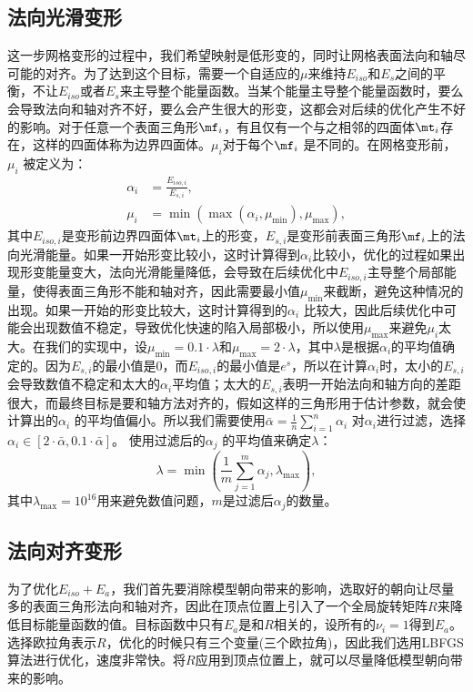 \subsection{法向光滑变形} \label{subsec:smooth}
这一步网格变形的过程中，我们希望映射是低形变的，同时让网格表面法向和轴尽可能的对齐。为了达到这个目标，需要一个自适应的$\mu$来维持$E_{iso}$和$E_s$之间的平衡，不让$E_{iso}$或者$E_s$来主导整个能量函数。当某个能量主导整个能量函数时，要么会导致法向和轴对齐不好，要么会产生很大的形变，这都会对后续的优化产生不好的影响。对于任意一个表面三角形$\mf_i$，有且仅有一个与之相邻的四面体$\mt_i$存在，这样的四面体称为边界四面体。$\mu_i$对于每个$\mf_i$ 是不同的。在网格变形前，$\mu_i$ 被定义为：
\begin{align}
\alpha_i &= \frac{E_{iso, i}}{E_{s, i}}, \\
\mu_i &= \min \left( \max \left( \alpha_i, \mu_{\min} \right) , \mu_{\max} \right),
\end{align}
其中$E_{iso, i}$是变形前边界四面体$\mt_i$上的形变，$E_{s, i}$是变形前表面三角形$\mf_i$上的法向光滑能量。如果一开始形变比较小，这时计算得到$\alpha_i$比较小，优化的过程如果出现形变能量变大，法向光滑能量降低，会导致在后续优化中$E_{iso,i}$主导整个局部能量，使得表面三角形不能和轴对齐，因此需要最小值$\mu_{\min}$来截断，避免这种情况的出现。如果一开始的形变比较大，这时计算得到的$\alpha_i$ 比较大，因此后续优化中可能会出现数值不稳定，导致优化快速的陷入局部极小，所以使用$\mu_{\max}$来避免$\mu_i$太大。在我们的实现中，设$\mu_{\min} = 0.1 \cdot \lambda$和$\mu_{\max} = 2 \cdot \lambda$，其中$\lambda$是根据$\alpha_i$的平均值确定的。因为$E_{s, i}$的最小值是0，而$E_{iso, i}$的最小值是$e^s$，所以在计算$\alpha_i$时，太小的$E_{s, i}$会导致数值不稳定和太大的$\alpha_i$平均值；太大的$E_{s, i}$表明一开始法向和轴方向的差距很大，而最终目标是要和轴方法对齐的，假如这样的三角形用于估计参数，就会使计算出的$\alpha_i$ 的平均值偏小。所以我们需要使用$ \bar{\alpha} = \frac{1}{n} \sum_{i=1}^n \alpha_i$ 对$\alpha_i$进行过滤，选择$\alpha_i \in \left[ 2 \cdot \bar{\alpha}, 0.1 \cdot \bar{\alpha} \right]$。 使用过滤后的$\alpha_j$ 的平均值来确定$\lambda$：
\begin{equation}
\lambda = \min \left( \frac{1}{m} \sum_{j=1}^m \alpha_j , \lambda_{\max} \right),
\end{equation}
其中$\lambda_{\max} = 10^{16}$用来避免数值问题，$m$是过滤后$\alpha_j$的数量。

\subsection{法向对齐变形} \label{subsec:align}
为了优化$E_{iso} + E_a$，我们首先要消除模型朝向带来的影响，选取好的朝向让尽量多的表面三角形法向和轴对齐，因此在顶点位置上引入了一个全局旋转矩阵$R$来降低目标能量函数的值。目标函数中只有$E_a$是和$R$相关的，设所有的$\nu_i=1$得到$E_a$。选择欧拉角表示$R$，优化的时候只有三个变量(三个欧拉角)，因此我们选用LBFGS 算法进行优化，速度非常快。将$R$应用到顶点位置上，就可以尽量降低模型朝向带来的影响。

